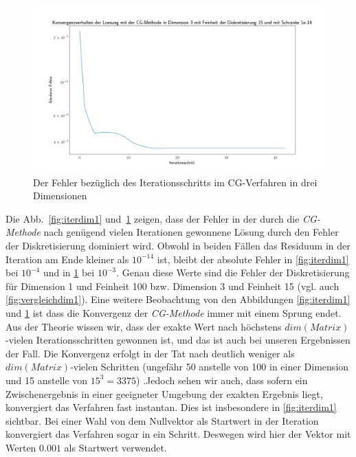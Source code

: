 \documentclass[smallheadings]{scrartcl}
\numberwithin{equation}{section}
\begin{document}
\begin{figure}[H]
	\centering
	\includegraphics[width=\linewidth]{Bilder/IterDim3}
	\caption{Der Fehler bezüglich des Iterationsschritts im CG-Verfahren in drei Dimensionen}
	\label{fig:iterdim3}
\end{figure}
 
Die Abb.~\ref{fig:iterdim1}  und~\ref{fig:iterdim3} zeigen, dass der Fehler in der durch die \textit{CG-Methode} nach genügend vielen Iterationen gewonnene Lösung durch den Fehler der Diskretisierung dominiert wird. Obwohl in beiden Fällen das Residuum in der Iteration am Ende kleiner als $10^{-14}$ ist, bleibt der absolute Fehler in \ref{fig:iterdim1} bei $10^{-4}$ und in \ref{fig:iterdim3} bei $10^{-3}$. Genau diese Werte sind die Fehler der Diskretisierung für Dimension 1 und Feinheit 100 bzw. Dimension 3 und Feinheit 15 (vgl. auch  \ref{fig:vergleichdim1}). Eine weitere Beobachtung von den Abbildungen \ref{fig:iterdim1} und \ref{fig:iterdim3} ist dass die Konvergenz der \textit{CG-Methode} immer mit einem Sprung endet. Aus der Theorie wissen wir, dass der exakte Wert nach höchstens $dim(Matrix)$-vielen Iterationsschritten gewonnen ist, und das ist auch bei unseren Ergebnissen der Fall. Die Konvergenz erfolgt in der Tat nach deutlich weniger als $dim(Matrix)$-vielen Schritten (ungefähr 50 anstelle von 100 in einer Dimension und 15 anstelle von $15^3=3375$) .Jedoch sehen wir auch, dass sofern ein Zwischenergebnis in einer geeigneter Umgebung der exakten Ergebnis liegt, konvergiert das Verfahren fast instantan.  Dies ist insbesondere in \ref{fig:iterdim1} sichtbar. Bei einer Wahl von dem Nullvektor als Startwert in der Iteration konvergiert das Verfahren sogar in ein Schritt. Deswegen wird hier der Vektor mit Werten $0.001$ als Startwert verwendet. 
 
\end{document}
